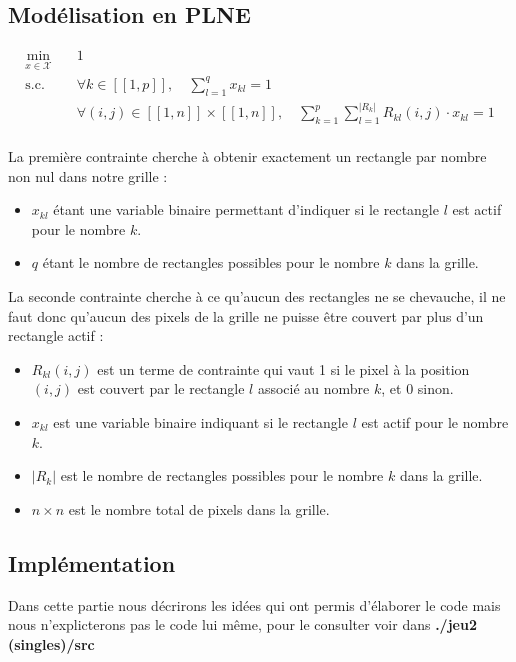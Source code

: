 \documentclass[a4paper,12pt,titlepage,leqno]{article}
\begin{document}
\subsection{Modélisation en PLNE}

\begin{equation}\label{eq::modele}
\begin{aligned}
\min_{x\in\mathcal{X}} &\quad 1\\
\text{s.c.} &\quad \forall k\in[\![1,p]\!], \quad \sum_{l=1}^{q} x_{kl} = 1\\
&\quad \forall (i,j)\in [\![1,n]\!] \times [\![1,n]\!], \quad \sum_{k=1}^{p} \sum_{l=1}^{|R_k|} R_{kl}(i, j) \cdot x_{kl} = 1\\
\end{aligned}
\end{equation}

La première contrainte cherche à obtenir exactement un rectangle par nombre non nul dans notre grille :

\begin{itemize}
    \item \( x_{kl} \) étant une variable binaire permettant d'indiquer si le rectangle \( l \) est actif pour le nombre \( k \).
    \item \( q \) étant le nombre de rectangles possibles pour le nombre \( k \) dans la grille.
\end{itemize}

La seconde contrainte cherche à ce qu'aucun des rectangles ne se chevauche, il ne faut donc qu'aucun des pixels de la grille ne puisse être couvert par plus d'un rectangle actif :

\begin{itemize}
    \item \( R_{kl}(i, j) \) est un terme de contrainte qui vaut 1 si le pixel à la position \( (i, j) \) est couvert par le rectangle \( l \) associé au nombre \( k \), et 0 sinon.
    \item \( x_{kl} \) est une variable binaire indiquant si le rectangle \( l \) est actif pour le nombre \( k \).
    \item \( |R_k| \) est le nombre de rectangles possibles pour le nombre \( k \) dans la grille.
    \item \( n \times n \) est le nombre total de pixels dans la grille.
\end{itemize}


\subsection{Implémentation}
Dans cette partie nous décrirons les idées qui ont permis d'élaborer le code mais nous n'explicterons pas le code lui même, pour le consulter voir dans 
\textbf{./jeu2 (singles)/src}
\end{document}
